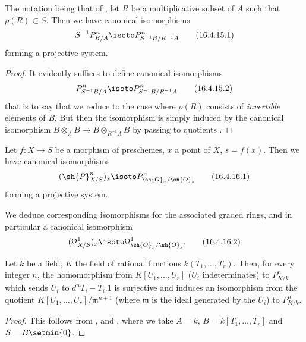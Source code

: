 \begin{corollary}[16.4.15]
\label{IV.16.4.15}
The notation being that of , let $R$ be a multiplicative subset of $A$ such that $\rho(R) \subset S$.
Then we have canonical isomorphisms 
\[
  \label{IV.16.4.15.1}
  S^{-1}P_{B/A}^n \isoto P_{S^{-1}B/R^{-1}A}^n
  \tag{16.4.15.1}
\]
forming a projective system.
\end{corollary}

\begin{proof}
It evidently suffices to define canonical isomorphisms 
\[
  \label{IV.16.4.15.2}
  P_{S^{-1}B/A}^n \isoto P_{S^{-1}B/R^{-1}A}^n
  \tag{16.4.15.2}
\]
that is to say that we reduce to the case where $\rho(R)$ consists of \emph{invertible} elements of $B$.
But then the isomorphism  is simply induced by the canonical isomorphism $B \otimes_A B \to B \otimes_{R^{-1}A} B$ by passing to quotients .
\end{proof}

\begin{corollary}[16.4.16]
\label{IV.16.4.16}
Let $f:X \to S$ be a morphism of preschemes, $x$ a point of $X$, $s = f(x)$.
Then we have canonical isomorphisms
\[
  \label{IV.16.4.16.1}
  (\sh{P}_{X/S}^n)_x \isoto P_{\sh{O}_x/\sh{O}_s}^n
  \tag{16.4.16.1}
\]
forming a projective system.
\end{corollary}

We deduce corresponding isomorphisms for the associated graded rings, and in particular a canonical isomorphism
\[
  \label{IV.16.4.16.2}
  (\Omega_{X/S}^1)_x \isoto \Omega_{\sh{O}_x/\sh{O}_s}^1.
  \tag{16.4.16.2}
\]

\begin{corollary}[16.4.17]
\label{IV.16.4.17}
Let $k$ be a field, $K$ the field of rational functions $k(T_1, \dots, T_r)$.
Then, for every integer $n$, the homomorphism from $K[U_1, \dots, U_r]$ ($U_i$ indeterminates) to $P_{K/k}^n$ which sends $U_i$ to $d^nT_i - T_i.1$ is surjective and induces an isomorphism from the quotient $K[U_1, \dots, U_r]/\mathfrak{m}^{n+1}$ (where $\mathfrak{m}$ is the ideal generated by the $U_i$) to $P_{K/k}^n$.
\end{corollary}

\begin{proof}
This follows from ,   and , where we take $A = k$, $B = k[T_1, \dots, T_r]$ and $S = B \setmin \{0\}$.
\end{proof}

